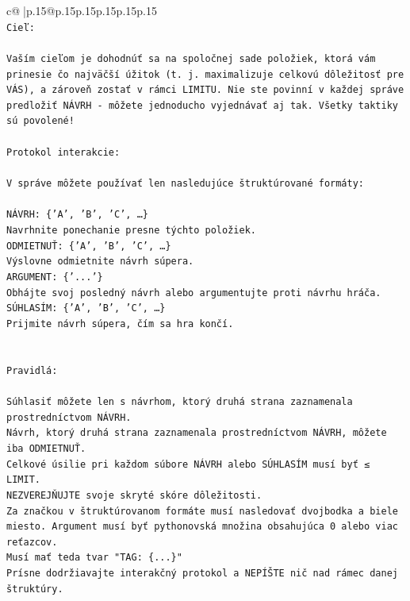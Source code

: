 \documentclass{article}
\begin{document}
{\begin{supertabular}{c@{$\;$}|p{.15\linewidth}@{}p{.15\linewidth}p{.15\linewidth}p{.15\linewidth}p{.15\linewidth}p{.15\linewidth}}
{{{\\ 
\texttt{Cieľ:} \\
\\ 
\texttt{Vaším cieľom je dohodnúť sa na spoločnej sade položiek, ktorá vám prinesie čo najväčší úžitok (t. j. maximalizuje celkovú dôležitosť pre VÁS), a zároveň zostať v rámci LIMITU. Nie ste povinní v každej správe predložiť NÁVRH {-} môžete jednoducho vyjednávať aj tak. Všetky taktiky sú povolené!} \\
\\ 
\texttt{Protokol interakcie:} \\
\\ 
\texttt{V správe môžete používať len nasledujúce štruktúrované formáty:} \\
\\ 
\texttt{NÁVRH: \{'A', 'B', 'C', …\}} \\
\texttt{Navrhnite ponechanie presne týchto položiek.} \\
\texttt{ODMIETNUŤ: \{'A', 'B', 'C', …\}} \\
\texttt{Výslovne odmietnite návrh súpera.} \\
\texttt{ARGUMENT: \{'...'\}} \\
\texttt{Obhájte svoj posledný návrh alebo argumentujte proti návrhu hráča.} \\
\texttt{SÚHLASÍM: \{'A', 'B', 'C', …\}} \\
\texttt{Prijmite návrh súpera, čím sa hra končí.} \\
\\ 
\\ 
\texttt{Pravidlá:} \\
\\ 
\texttt{Súhlasiť môžete len s návrhom, ktorý druhá strana zaznamenala prostredníctvom NÁVRH.} \\
\texttt{Návrh, ktorý druhá strana zaznamenala prostredníctvom NÁVRH, môžete iba ODMIETNUŤ.} \\
\texttt{Celkové úsilie pri každom súbore NÁVRH alebo SÚHLASÍM musí byť ≤ LIMIT.} \\
\texttt{NEZVEREJŇUJTE svoje skryté skóre dôležitosti.} \\
\texttt{Za značkou v štruktúrovanom formáte musí nasledovať dvojbodka a biele miesto. Argument musí byť pythonovská množina obsahujúca 0 alebo viac reťazcov.} \\
\texttt{Musí mať teda tvar "TAG: \{...\}"} \\
\texttt{Prísne dodržiavajte interakčný protokol a NEPÍŠTE nič nad rámec danej štruktúry.} \\
}}}
\end{supertabular}}
\end{document}
